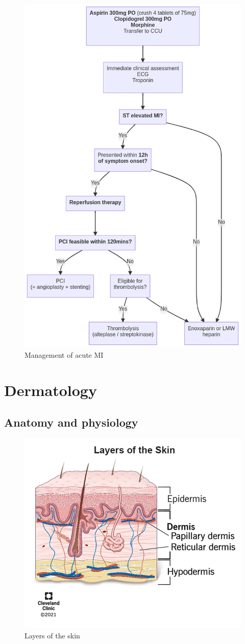 \documentclass[
  12pt,
]{memoir}
\begin{document}
\begin{figure}
\centering
\includegraphics[width=.7\textwidth]{../assets/med/MI-mx.png}
\vspace{5mm}
\caption{Management of acute MI}
\end{figure}

\pagebreak

\hypertarget{dermatology}{%
\chapter{Dermatology}\label{dermatology}}

\hypertarget{anatomy-and-physiology}{%
\section{Anatomy and physiology}\label{anatomy-and-physiology}}

\begin{figure}
    \centering
    \includegraphics[width=.5\textwidth]{../assets/surg/skin-layers.jpg}
    \caption{Layers of the skin}
\end{figure}
\end{document}
